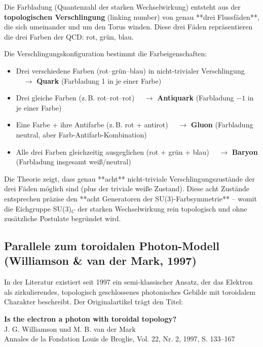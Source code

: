 	Die Farbladung (Quantenzahl der starken Wechselwirkung) entsteht aus der \textbf{topologischen Verschlingung} (linking number) von genau **drei Flussfäden**, die sich umeinander und um den Torus winden. Diese drei Fäden repräsentieren die drei Farben der QCD: rot, grün, blau.
	
	Die Verschlingungskonfiguration bestimmt die Farbeigenschaften:
	\begin{itemize}
		\item Drei verschiedene Farben (rot–grün–blau) in nicht-trivialer Verschlingung $\quad \to$ \textbf{Quark} \quad (Farbladung 1 in je einer Farbe)
		\item Drei gleiche Farben (z.\,B. rot–rot–rot) $\quad \to$ \textbf{Antiquark} \quad (Farbladung $-1$ in je einer Farbe)
		\item Eine Farbe + ihre Antifarbe (z.\,B. rot + antirot) $\quad \to$ \textbf{Gluon} \quad (Farbladung neutral, aber Farb-Antifarb-Kombination)
		\item Alle drei Farben gleichzeitig ausgeglichen (rot + grün + blau) $\quad \to$ \textbf{Baryon} \quad (Farbladung insgesamt weiß/neutral)
	\end{itemize}
	
	Die Theorie zeigt, dass genau **acht** nicht-triviale Verschlingungszustände der drei Fäden möglich sind (plus der triviale weiße Zustand). Diese acht Zustände entsprechen präzise den **acht Generatoren der SU(3)-Farbsymmetrie** – womit die Eichgruppe SU(3)$_C$ der starken Wechselwirkung rein topologisch und ohne zusätzliche Postulate begründet wird.
	
	\subsection{Parallele zum toroidalen Photon-Modell (Williamson \& van der Mark, 1997)}
	
	In der Literatur existiert seit 1997 ein semi-klassischer Ansatz, der das Elektron als zirkulierendes, topologisch geschlossenes photonisches Gebilde mit toroidalem Charakter beschreibt. Der Originalartikel trägt den Titel:
	
	\begin{center}
		\textbf{Is the electron a photon with toroidal topology?} \\
		J. G. Williamson und M. B. van der Mark \\
		Annales de la Fondation Louis de Broglie, Vol. 22, Nr. 2, 1997, S. 133--167
	\end{center}
	

